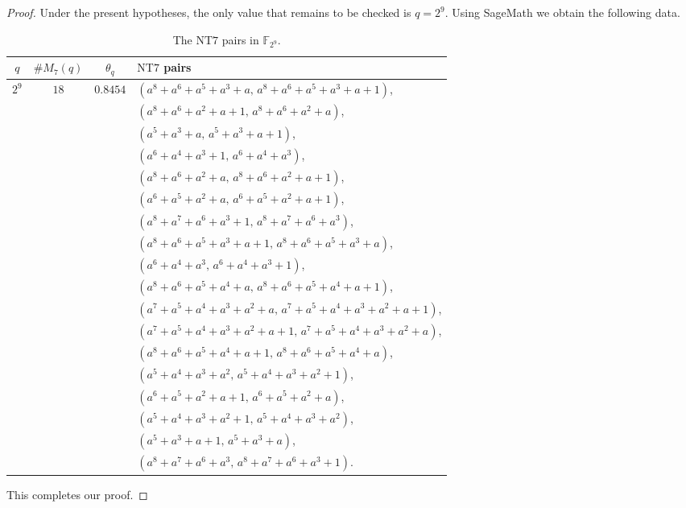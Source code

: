 \documentclass[12pt]{amsart}
\theoremstyle{definition}
\theoremstyle{remark}
\numberwithin{equation}{section}
\begin{document}
\begin{proof}
Under the present hypotheses, the only value that remains to be checked is $q=2^9$. Using SageMath we obtain the following data.
\begin{table}[h]
\centering
\scriptsize
\begin{tabular}{c|c|c|p{8cm}}
$q$ & $\#M_7(q)$ & $\theta_q$ & $\mathrm{NT}7$ pairs \\ \hline
$2^9$ & $18$ & $0.8454$ &
$\left(a^8+a^6+a^5+a^3+a,\,
a^8+a^6+a^5+a^3+a+1\right)$, \\
&&&
$\left(a^8+a^6+a^2+a+1,\,
a^8+a^6+a^2+a\right)$, \\
&&&
$\left(a^5+a^3+a,\,
a^5+a^3+a+1\right)$, \\
&&&
$\left(a^6+a^4+a^3+1,\,
a^6+a^4+a^3\right)$, \\
&&&
$\left(a^8+a^6+a^2+a,\,
a^8+a^6+a^2+a+1\right)$, \\
&&&
$\left(a^6+a^5+a^2+a,\,
a^6+a^5+a^2+a+1\right)$, \\
&&&
$\left(a^8+a^7+a^6+a^3+1,\,
a^8+a^7+a^6+a^3\right)$, \\
&&&
$\left(a^8+a^6+a^5+a^3+a+1,\,
a^8+a^6+a^5+a^3+a\right)$, \\
&&&
$\left(a^6+a^4+a^3,\,
a^6+a^4+a^3+1\right)$, \\
&&&
$\left(a^8+a^6+a^5+a^4+a,\,
a^8+a^6+a^5+a^4+a+1\right)$, \\
&&&
$\left(a^7+a^5+a^4+a^3+a^2+a,\,
a^7+a^5+a^4+a^3+a^2+a+1\right)$, \\
&&&
$\left(a^7+a^5+a^4+a^3+a^2+a+1,\,
a^7+a^5+a^4+a^3+a^2+a\right)$, \\
&&&
$\left(a^8+a^6+a^5+a^4+a+1,\,
a^8+a^6+a^5+a^4+a\right)$, \\
&&&
$\left(a^5+a^4+a^3+a^2,\,
a^5+a^4+a^3+a^2+1\right)$, \\
&&&
$\left(a^6+a^5+a^2+a+1,\,
a^6+a^5+a^2+a\right)$, \\
&&&
$\left(a^5+a^4+a^3+a^2+1,\,
a^5+a^4+a^3+a^2\right)$, \\
&&&
$\left(a^5+a^3+a+1,\,
a^5+a^3+a\right)$, \\
&&&
$\left(a^8+a^7+a^6+a^3,\,
a^8+a^7+a^6+a^3+1\right)$.
\end{tabular}
\caption{The $\mathrm{NT}7$ pairs in $\mathbb{F}_{2^9}$.}
\label{tab:nt7}
\end{table}


This completes our proof.
\end{proof}
\end{document}
